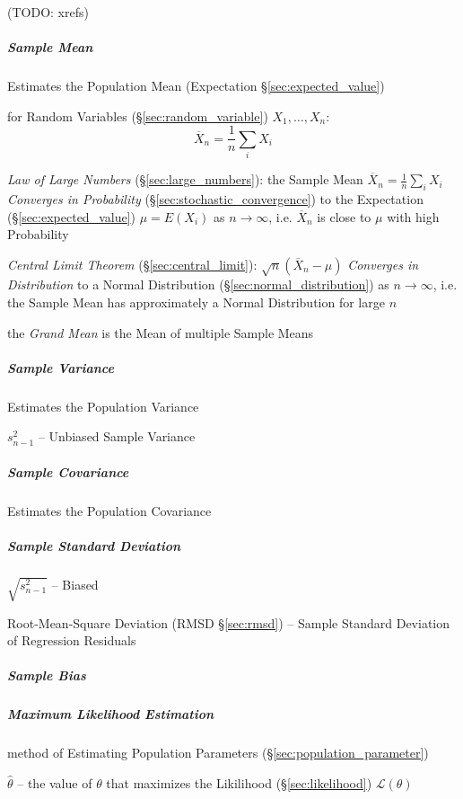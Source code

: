 (TODO: xrefs)



\subparagraph{Sample Mean}\label{sec:sample_mean}

Estimates the Population Mean (Expectation \S\ref{sec:expected_value})

for Random Variables (\S\ref{sec:random_variable}) $X_1, \ldots, X_n$:
\[
  \overline{X}_n = \frac{1}{n}\sum_i X_i
\]

\emph{Law of Large Numbers} (\S\ref{sec:large_numbers}): the Sample Mean
$\overline{X}_n = \frac{1}{n}\sum_i X_i$ \emph{Converges in Probability}
(\S\ref{sec:stochastic_convergence}) to the Expectation
(\S\ref{sec:expected_value}) $\mu = E(X_i)$ as $n \to \infty$, i.e.
$\overline{X}_n$ is close to $\mu$ with high Probability

\emph{Central Limit Theorem} (\S\ref{sec:central_limit}):
$\sqrt{n}(\overline{X}_n - \mu)$ \emph{Converges in Distribution} to a Normal
Distribution (\S\ref{sec:normal_distribution}) as $n \to \infty$, i.e.
the Sample Mean has approximately a Normal Distribution for large $n$

the \emph{Grand Mean} is the Mean of multiple Sample Means



\subparagraph{Sample Variance}\label{sec:sample_variance}\hfill

Estimates the Population Variance

$s^2_{n-1}$ -- Unbiased Sample Variance



\subparagraph{Sample Covariance}\label{sec:sample_covariance}\hfill

Estimates the Population Covariance



\subparagraph{Sample Standard Deviation}
\label{sec:sample_standard_deviation}\hfill

$\sqrt{s^2_{n-1}}$ -- Biased

\fist Root-Mean-Square Deviation (RMSD \S\ref{sec:rmsd}) -- Sample Standard
Deviation of Regression Residuals



\subparagraph{Sample Bias}\label{sec:sample_bias}\hfill

\subparagraph{Maximum Likelihood Estimation}\label{sec:mle}\hfill

method of Estimating Population Parameters (\S\ref{sec:population_parameter})

$\hat{\theta}$ -- the value of $\theta$ that maximizes the Likilihood
(\S\ref{sec:likelihood}) $\mathcal{L}(\theta)$


